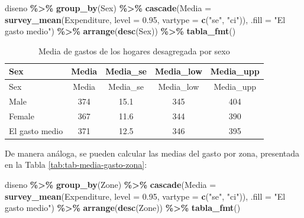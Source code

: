 \documentclass[
  spanish,
  12pt,
]{book}
\newenvironment{Shaded}{\begin{snugshade}}{\end{snugshade}}
\newcommand{\AttributeTok}[1]{\textcolor[rgb]{0.13,0.29,0.53}{#1}}
\newcommand{\FloatTok}[1]{\textcolor[rgb]{0.00,0.00,0.81}{#1}}
\newcommand{\FunctionTok}[1]{\textcolor[rgb]{0.13,0.29,0.53}{\textbf{#1}}}
\newcommand{\NormalTok}[1]{#1}
\newcommand{\SpecialCharTok}[1]{\textcolor[rgb]{0.81,0.36,0.00}{\textbf{#1}}}
\newcommand{\StringTok}[1]{\textcolor[rgb]{0.31,0.60,0.02}{#1}}
\begin{document}
\begin{Shaded}
\begin{Highlighting}[]
\NormalTok{diseno }\SpecialCharTok{\%\textgreater{}\%} 
  \FunctionTok{group\_by}\NormalTok{(Sex) }\SpecialCharTok{\%\textgreater{}\%}
  \FunctionTok{cascade}\NormalTok{(}\AttributeTok{Media =} \FunctionTok{survey\_mean}\NormalTok{(Expenditure, }
                              \AttributeTok{level =} \FloatTok{0.95}\NormalTok{,}
                              \AttributeTok{vartype =}  \FunctionTok{c}\NormalTok{(}\StringTok{"se"}\NormalTok{, }\StringTok{"ci"}\NormalTok{)),}
        \AttributeTok{.fill =} \StringTok{"El gasto medio"}\NormalTok{) }\SpecialCharTok{\%\textgreater{}\%}
  \FunctionTok{arrange}\NormalTok{(}\FunctionTok{desc}\NormalTok{(Sex)) }\SpecialCharTok{\%\textgreater{}\%}
  \FunctionTok{tabla\_fmt}\NormalTok{()}
\end{Highlighting}
\end{Shaded}

\begin{longtable}[]{@{}lcccc@{}}
\caption{\label{tab:tab-media-gasto-sexo}Media de gastos de los hogares desagregada por sexo}\tabularnewline
\toprule\noalign{}
Sex & Media & Media\_se & Media\_low & Media\_upp \\
\midrule\noalign{}
\endfirsthead
\toprule\noalign{}
Sex & Media & Media\_se & Media\_low & Media\_upp \\
\midrule\noalign{}
\endhead
\bottomrule\noalign{}
\endlastfoot
Male & 374 & 15.1 & 345 & 404 \\
Female & 367 & 11.6 & 344 & 390 \\
El gasto medio & 371 & 12.5 & 346 & 395 \\
\end{longtable}

De manera análoga, se pueden calcular las medias del gasto por zona, presentada en la Tabla \ref{tab:tab-media-gasto-zona}:

\begin{Shaded}
\begin{Highlighting}[]
\NormalTok{diseno }\SpecialCharTok{\%\textgreater{}\%} 
  \FunctionTok{group\_by}\NormalTok{(Zone) }\SpecialCharTok{\%\textgreater{}\%}
  \FunctionTok{cascade}\NormalTok{(}\AttributeTok{Media =} \FunctionTok{survey\_mean}\NormalTok{(Expenditure, }
                              \AttributeTok{level =} \FloatTok{0.95}\NormalTok{,}
                              \AttributeTok{vartype =}  \FunctionTok{c}\NormalTok{(}\StringTok{"se"}\NormalTok{, }\StringTok{"ci"}\NormalTok{)),}
        \AttributeTok{.fill =} \StringTok{"El gasto medio"}\NormalTok{) }\SpecialCharTok{\%\textgreater{}\%}
  \FunctionTok{arrange}\NormalTok{(}\FunctionTok{desc}\NormalTok{(Zone)) }\SpecialCharTok{\%\textgreater{}\%}
  \FunctionTok{tabla\_fmt}\NormalTok{()}
\end{Highlighting}
\end{Shaded}
\end{document}
